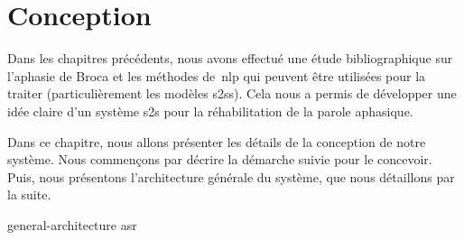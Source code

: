 \chapter{Conception}
\label{chap.conception}

Dans les chapitres précédents, nous avons effectué une étude bibliographique sur l'aphasie de Broca 
et les méthodes de~\gls{nlp} qui peuvent être utilisées pour la traiter 
(particulièrement les modèles \glspl{s2s}).
Cela nous a permis de développer une idée claire d'un système \gls{s2s} pour la réhabilitation de la parole aphasique.

Dans ce chapitre, nous allons présenter les détails de la conception de notre système.
Nous commençons par décrire la démarche suivie pour le concevoir.
Puis, nous présentons l'architecture générale du système, 
que nous détaillons par la suite.

{general-architecture}
{asr}
